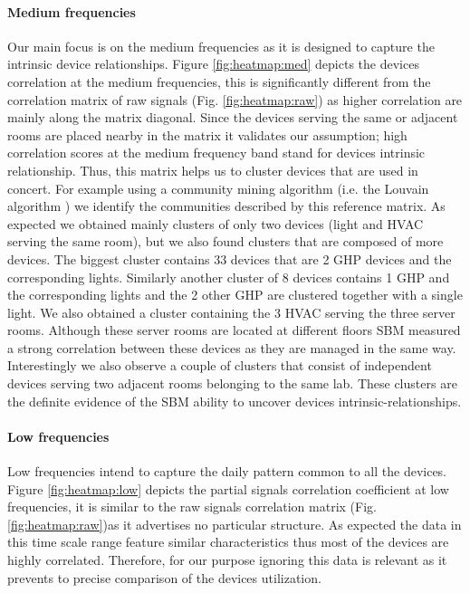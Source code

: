 \paragraph{Medium frequencies}
Our main focus is on the medium frequencies as it is designed to capture the intrinsic device relationships.
Figure \ref{fig:heatmap:med} depicts the devices correlation at the medium frequencies, this is significantly different from the correlation matrix of raw signals (Fig. \ref{fig:heatmap:raw}) as higher correlation are mainly along the matrix diagonal. 
Since the devices serving the same or adjacent rooms are placed nearby in the matrix it validates our assumption; high correlation scores at the medium frequency band stand for devices intrinsic relationship.
Thus, this matrix helps us to cluster devices that are used in concert.
For example using a community mining algorithm (i.e. the Louvain algorithm \cite{blondel:unfolding}) we identify the communities described by this reference matrix.
As expected we obtained mainly clusters of only two devices (light and HVAC serving the same room), but we also found clusters that are composed of more devices.
The biggest cluster contains 33 devices that are 2 GHP devices and the corresponding lights.
Similarly another cluster of 8 devices contains 1 GHP and the corresponding lights and the 2 other GHP are clustered together with a single light.
We also obtained a cluster containing the 3 HVAC serving the three server rooms. Although these server rooms are located at different floors SBM measured a strong correlation between these devices as they are managed in the same way.
Interestingly we also observe a couple of clusters that consist of independent devices serving two adjacent rooms belonging to the same lab.
These clusters are the definite evidence of the SBM ability to uncover devices intrinsic-relationships.
 
\paragraph{Low frequencies}
Low frequencies intend to capture the daily pattern common to all the devices.
Figure \ref{fig:heatmap:low} depicts the partial signals correlation coefficient at low frequencies, it is similar to the raw signals correlation matrix (Fig. \ref{fig:heatmap:raw})as it advertises no particular structure.
As expected the data in this time scale range feature similar characteristics thus most of the devices are highly correlated.
Therefore, for our purpose ignoring this data is relevant as it prevents to precise comparison of the devices utilization.
 

